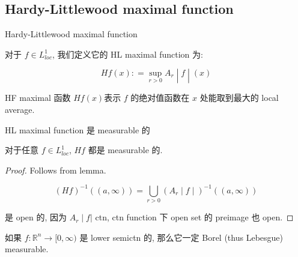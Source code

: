 \documentclass{qlnotes-export}
\begin{document}
\subsection{Hardy-Littlewood maximal function}\label{hardy-littlewood-maximal-function}

\begin{definition}{Hardy-Littlewood maximal function}\label{def-08-hardy-littlewood-ldt-hardy-littlewood-maximal-function}

对于 \(f \in L_{loc}^{1}\), 我们定义它的 HL maximal function 为:

\[\left. Hf(x): = \sup\limits_{r > 0}A_{r} \middle| f \middle| (x) \right.\]

\end{definition}

HF maximal 函数 \(Hf(x)\)表示 \(f\) 的绝对值函数在 \(x\) 处能取到最大的 local average.

\begin{theorem}{HL maximal function 是 measurable 的}\label{thm-08-hardy-littlewood-ldt-hl-maximal-function-measurable}

对于任意 \(f \in L_{loc}^{1}\), \(Hf\) 都是 measurable 的.

\end{theorem}

\begin{proof}

Follows from lemma.

\[\left. (Hf)^{- 1}((a,\infty)) = \bigcup\limits_{r > 0}(A_{r} \middle| f \middle| )^{- 1}((a,\infty)) \right.\]

是 open 的, 因为 \(\left. A_{r} \middle| f| \right.\) ctn, ctn function 下 open set 的 preimage 也 open.

\end{proof}

\begin{corollary}\label{cor-08-hardy-littlewood-ldt-corollary-001}

如果 \(f:{\mathbb{R}}^{n}\rightarrow\lbrack 0,\infty)\) 是 lower semictn 的, 那么它一定 Borel (thus Lebesgue) measurable.

\end{corollary}
\end{document}
